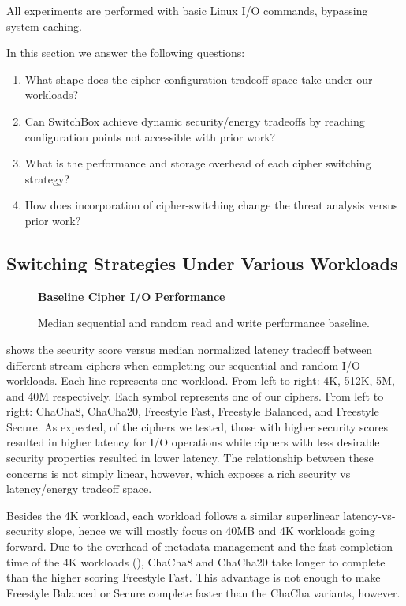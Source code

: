 All experiments are performed with basic Linux I/O commands, bypassing system
caching.

In this section we answer the following questions:

\begin{enumerate}
 \item What shape does the cipher configuration tradeoff space take under
 our workloads?
 \item Can SwitchBox achieve dynamic security/energy tradeoffs by reaching
 configuration points not accessible with prior work?
 \item What is the performance and storage overhead of each cipher switching
 strategy?
 \item How does incorporation of cipher-switching change the threat analysis
 versus prior work?
\end{enumerate}


\subsection{Switching Strategies Under Various Workloads}

\begin{figure}[ht]
  \textbf{Baseline Cipher I/O Performance}\par\medskip
  {} \caption{Median sequential and random
  read and write performance baseline.}
 \label{fig:tradeoff-no-ratios}
\end{figure}

 shows the security score versus median normalized
latency tradeoff between different stream ciphers when completing our sequential
and random I/O workloads. Each line represents one workload. From left to right:
4K, 512K, 5M, and 40M respectively. Each symbol represents one of our ciphers.
From left to right: ChaCha8, ChaCha20, Freestyle Fast, Freestyle Balanced, and
Freestyle Secure. As expected, of the ciphers we tested, those with higher
security scores resulted in higher latency for I/O operations while ciphers with
less desirable security properties resulted in lower latency. The relationship
between these concerns is not simply linear, however, which exposes a rich
security vs latency/energy tradeoff space.

Besides the 4K workload, each workload follows a similar superlinear
latency-vs-security slope, hence we will mostly focus on 40MB and 4K workloads
going forward. Due to the overhead of metadata management and the fast
completion time of the 4K workloads (), ChaCha8 and ChaCha20 take longer to complete than the higher scoring
Freestyle Fast. This advantage is not enough to make Freestyle Balanced or
Secure complete faster than the ChaCha variants, however.


